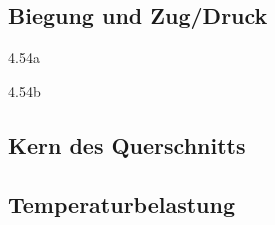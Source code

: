\documentclass[11pt]{article}
\newcommand{\1}{ {\mathds{1}} }
\begin{document}
\begin{multicols*}{3}
		\subsection{Biegung und Zug/Druck}

		\begin{formel}{4.54a}
			\times
		\end{formel}

		\begin{formel}{4.54b}
			\times
		\end{formel}

		\subsection{Kern des Querschnitts}

		\begin{formel}{4.55}
			\times
		\end{formel}

		\begin{formel}{4.56}
			\times
		\end{formel}

		\begin{formel}{4.57}
			\times
		\end{formel}
		\subsection{Temperaturbelastung}

		\begin{formel}{4.58}
			\times
		\end{formel}

		\begin{formel}{4.59}
			\times
		\end{formel}

		\begin{formel}{4.60}
			\times
		\end{formel}

		\begin{formel}{4.61}
			\times
		\end{formel}

		\begin{formel}{4.62}
			\times
		\end{formel}

		\begin{formel}{4.63}
			\times
		\end{formel}

		\begin{formel}{4.64}
			\times
		\end{formel}


\end{multicols*}
\end{document}
